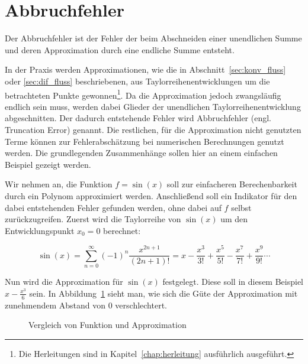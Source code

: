 \section{Abbruchfehler}

Der Abbruchfehler ist der Fehler der beim Abschneiden einer unendlichen Summe
und deren Approximation durch eine endliche Summe entsteht.

In der Praxis werden Approximationen, wie die in Abschnitt~\ref{sec:konv_fluss} oder
\ref{sec:dif_fluss} beschriebenen, aus Taylorreihenentwicklungen um die betrachteten
Punkte gewonnen\footnote{Die Herleitungen sind in Kapitel~\ref{chap:herleitung} ausführlich ausgeführt.}. 
Da die Approximation jedoch zwangsläufig endlich sein muss, werden
dabei Glieder der unendlichen Taylorreihenentwicklung abgeschnitten. Der dadurch entstehende
Fehler wird Abbruchfehler (engl. Truncation Error) genannt.
Die restlichen, für die Approximation nicht genutzten Terme können zur Fehlerabschätzung
bei numerischen Berechnungen genutzt werden. Die grundlegenden Zusammenhänge sollen hier an einem einfachen Beispiel gezeigt werden.

Wir nehmen an, die Funktion $f=\sin(x)$ soll zur einfacheren Berechenbarkeit durch
ein Polynom approximiert werden. Anschließend soll ein Indikator für den dabei
entstehenden Fehler gefunden werden, ohne dabei auf $f$
selbst zurückzugreifen.
Zuerst wird die Taylorreihe von $\sin(x)$ um den Entwicklungspunkt $x_0 =0$ berechnet:

\begin{equation}
  \sin(x) = \sum_{n=0}^{\infty}(-1)^n \frac{x^{2n+1}}{(2n+1)!} = 
  x-\frac{x^3}{3!} +\frac{x^5}{5!} -\frac{x^7}{7!} +\frac{x^9}{9!}\cdots
 \label{eq:taylor_example}
\end{equation}

Nun wird die Approximation für $\sin(x)$ festgelegt. Diese soll in diesem Beispiel
$x-\frac{x^3}{6} $ sein. In Abbildung~\ref{fig:taylor_example} sieht man, wie sich die Güte der
Approximation mit zunehmendem Abstand von $0$ verschlechtert.

\begin{figure}[h]
\centering
\caption{Vergleich von Funktion und Approximation}
 \label{fig:taylor_example}
\end{figure}


